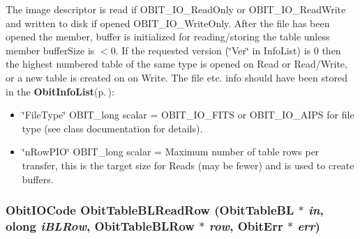 The image descriptor is read if OBIT\_\-IO\_\-Read\-Only or OBIT\_\-IO\_\-Read\-Write and written to disk if opened OBIT\_\-IO\_\-Write\-Only. After the file has been opened the member, buffer is initialized for reading/storing the table unless member buffer\-Size is $<$0. If the requested version (\char`\"{}Ver\char`\"{} in Info\-List) is 0 then the highest numbered table of the same type is opened on Read or Read/Write, or a new table is created on on Write. The file etc. info should have been stored in the {\bf Obit\-Info\-List}{\rm (p.\,\pageref{structObitInfoList})}: \begin{itemize}
\item \char`\"{}File\-Type\char`\"{} OBIT\_\-long scalar = OBIT\_\-IO\_\-FITS or OBIT\_\-IO\_\-AIPS for file type (see class documentation for details). \item \char`\"{}n\-Row\-PIO\char`\"{} OBIT\_\-long scalar = Maximum number of table rows per transfer, this is the target size for Reads (may be fewer) and is used to create buffers. 
\end{itemize}
\subsubsection{\setlength{\rightskip}{0pt plus 5cm}Obit\-IOCode Obit\-Table\-BLRead\-Row ({\bf Obit\-Table\-BL} $\ast$ {\em in}, {\bf olong} {\em i\-BLRow}, {\bf Obit\-Table\-BLRow} $\ast$ {\em row}, {\bf Obit\-Err} $\ast$ {\em err})}\label{ObitTableBL_8h_a18}



